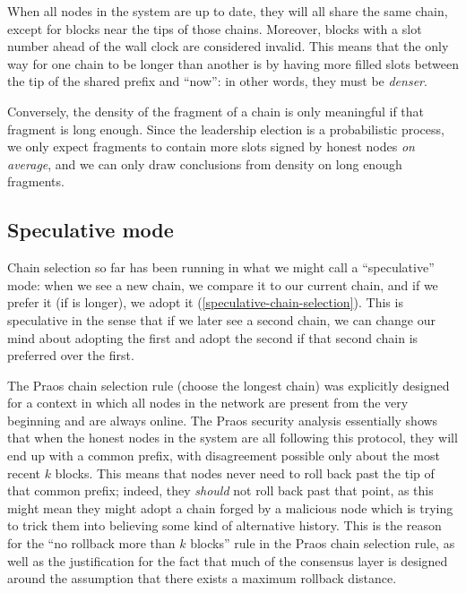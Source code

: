 When all nodes in the system are up to date, they will all share the same
chain, except for blocks near the tips of those chains. Moreover, blocks with a
slot number ahead of the wall clock are considered invalid. This means that
the only way for one chain to be longer than another is by having more filled
slots between the tip of the shared prefix and ``now'': in other words, they
must be \emph{denser}.
%
\begin{center}
\end{center}
%
Conversely, the density of the fragment of a chain is only meaningful if that
fragment is long enough. Since the leadership election is a probabilistic
process, we only expect fragments to contain more slots signed by honest nodes
\emph{on average}, and we can only draw conclusions from density on long enough
fragments.

\subsection{Speculative mode}

Chain selection so far has been running in what we might call a ``speculative''
mode: when we see a new chain, we compare it to our current chain, and if we
prefer it (if is longer), we adopt it (\cref{speculative-chain-selection}). This
is speculative in the sense that if we later see a second chain, we can change
our mind about adopting the first and adopt the second if that second chain is
preferred over the first.

The Praos chain selection rule (choose the longest chain) was explicitly
designed for a context in which all nodes in the network are present from the
very beginning and are always online. The Praos security analysis
\cite{cryptoeprint:2017:573} essentially shows that when the honest nodes in the
system are all following this protocol, they will end up with a common prefix,
with disagreement possible only about the most recent $k$ blocks. This means that
nodes never need to roll back past the tip of that common prefix; indeed, they
\emph{should} not roll back past that point, as this might mean they might adopt
a chain forged by a malicious node which is trying to trick them into believing
some kind of alternative history. This is the reason for the ``no rollback more
than $k$ blocks'' rule in the Praos chain selection rule, as well as the
justification for the fact that much of the consensus layer is designed around
the assumption that there exists a maximum rollback distance.

